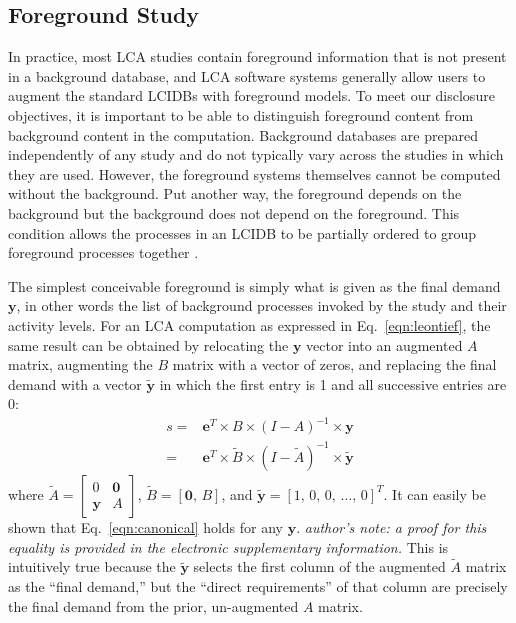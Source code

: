 \subsection{Foreground Study}

In practice, most LCA studies contain foreground information that is not present in a background database, and LCA software systems generally allow users to augment the standard LCIDBs with foreground models.  To meet our disclosure objectives, it is important to be able to distinguish foreground content from background content in the computation.  Background databases are prepared independently of any study and do not typically vary across the studies in which they are used.  However, the foreground systems themselves cannot be computed without the background.  Put another way, the foreground depends on the background but the background does not depend on the foreground.  This condition allows the processes in an LCIDB to be partially ordered to group foreground processes together \citep{Kuczenski_JLCA_2015}.  

The simplest conceivable foreground is simply what is given as the final demand $\mathbf{y}$, in other words the list of background processes invoked by the study and their activity levels.  For an LCA computation as expressed in Eq.~\ref{eqn:leontief}, the same result can be obtained by relocating the $\mathbf{y}$ vector into an augmented $A$ matrix, augmenting the $B$ matrix with a vector of zeros, and replacing the final demand with a vector $\tilde{\mathbf{y}}$ in which the first entry is 1 and all successive entries are 0:
\begin{equation}
  \begin{array}{cc}
s =& \mathbf{e}^T\times B\times\left(I-A\right)^{-1}\times\mathbf{y} \\
 =& \mathbf{e}^{T}\times\tilde{B}\times\left(I-\tilde{A}\right)^{-1}\times\tilde{\mathbf{y}}
  \end{array}
  \label{eqn:canonical}
\end{equation}
where $\tilde{A} = \left[\begin{smallmatrix}
 0 & \mathbf{0} \\
 \mathbf{y} & A
  \end{smallmatrix}\right]$, $\tilde{B} = [ \mathbf{0},\, B ]$, and $\tilde{\mathbf{y}} =  [ 1,\, 0,\, 0 ,\,\ldots,\, 0]^{T}$.
It can easily be shown that Eq.~\ref{eqn:canonical} holds for any $\mathbf{y}$.  \textit{author's note: a proof for this equality is provided in the electronic supplementary information.}  This is intuitively true because the $\tilde{\mathbf{y}}$ selects the first column of the augmented $\tilde{A}$ matrix as the ``final demand,'' but the ``direct requirements'' of that column are precisely the final demand from the prior, un-augmented $A$ matrix.  

